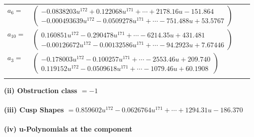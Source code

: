 \documentclass[1p]{elsarticle_modified}
\theoremstyle{definition}
\begin{document}
\begin{tabular}{m{7pt} m{180pt} m{7pt} m{180pt} }
\flushright $a_{6}=$&$\begin{pmatrix}-0.0838203 u^{172}+0.122068 u^{171}+\cdots+2178.16 u-151.864\\-0.000493639 u^{172}-0.0509278 u^{171}+\cdots-751.488 u+53.5767\end{pmatrix}$ \\
\flushright $a_{10}=$&$\begin{pmatrix}0.160851 u^{172}-0.290478 u^{171}+\cdots-6214.35 u+431.481\\-0.00126672 u^{172}-0.00132586 u^{171}+\cdots-94.2923 u+7.67446\end{pmatrix}$ \\
\flushright $a_{3}=$&$\begin{pmatrix}-0.178003 u^{172}-0.100257 u^{171}+\cdots-2553.46 u+209.740\\0.119152 u^{172}-0.0509618 u^{171}+\cdots-1079.46 u+60.1908\end{pmatrix}$\\&\end{tabular}
\flushleft \textbf{(ii) Obstruction class $= -1$}\\~\\
\flushleft \textbf{(iii) Cusp Shapes $= 0.859602 u^{172}-0.0626764 u^{171}+\cdots+1294.31 u-186.370$}\\~\\
\newpage\renewcommand{\arraystretch}{1}
\flushleft \textbf{(iv) u-Polynomials at the component}\newline \\
\end{document}
